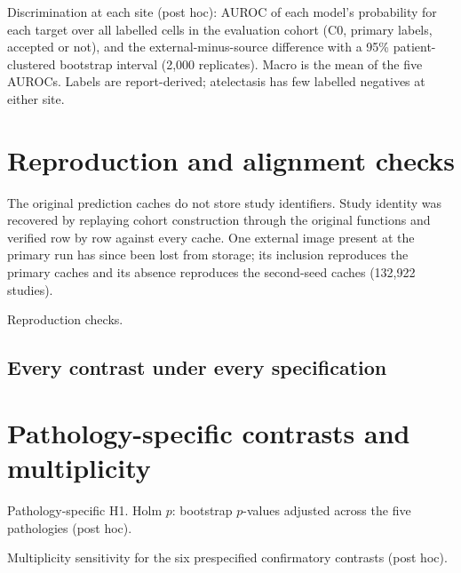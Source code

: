 \documentclass[10pt,a4paper]{article}
\begin{document}
\begin{table}[h]\centering\scriptsize
\caption{Discrimination at each site (post hoc): AUROC of each model's
probability for each target over all labelled cells in the evaluation cohort
(C0, primary labels, accepted or not), and the external-minus-source difference
with a 95\% patient-clustered bootstrap interval (2,000 replicates). Macro is
the mean of the five AUROCs. Labels are report-derived; atelectasis has few
labelled negatives at either site.}\label{stab:discrim}
\begin{adjustbox}{max width=\linewidth}\end{adjustbox}
\end{table}

\section{Reproduction and alignment checks}\label{ssec:repro}
The original prediction caches do not store study identifiers. Study identity
was recovered by replaying cohort construction through the original functions
and verified row by row against every cache. One external image present at the
primary run has since been lost from storage; its inclusion reproduces the
primary caches and its absence reproduces the second-seed caches (132,922
studies).
\begin{table}[h]\centering\small
\caption{Reproduction checks.}\label{stab:repro}

\end{table}

\begin{landscape}
\section{Every contrast under every specification}\label{ssec:allspecs}
\footnotesize

\normalsize
\end{landscape}

\section{Pathology-specific contrasts and multiplicity}\label{ssec:path}
\begin{table}[h]\centering\small
\caption{Pathology-specific H1. Holm $p$: bootstrap $p$-values adjusted across
the five pathologies (post hoc).}\label{stab:path}
\begin{adjustbox}{max width=\linewidth}\end{adjustbox}
\end{table}
\begin{table}[h]\centering\small
\caption{Multiplicity sensitivity for the six prespecified confirmatory contrasts
(post hoc).}\label{stab:mult}
\begin{adjustbox}{max width=\linewidth}\end{adjustbox}
\end{table}
\end{document}
